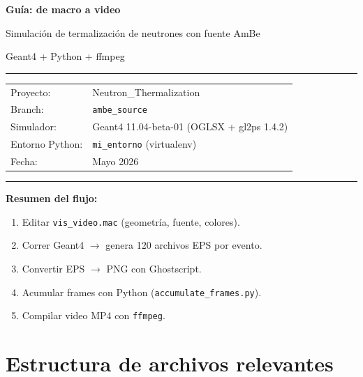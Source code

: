 \documentclass[11pt,a4paper]{article}
\begin{document}
\begin{titlepage}
  \centering
  \vspace*{3cm}
  {\Huge\bfseries Guía: de macro a video\par}
  \vspace{0.5cm}
  {\large Simulación de termalización de neutrones con fuente AmBe\par}
  \vspace{0.3cm}
  {\large Geant4 + Python + ffmpeg\par}
  \vspace{2cm}
  \rule{\textwidth}{1pt}
  \vspace{0.4cm}
  {\normalsize
    \begin{tabular}{ll}
      Proyecto:   & Neutron\_Thermalization \\
      Branch:     & \texttt{ambe\_source} \\
      Simulador:  & Geant4 11.04-beta-01 (OGLSX + gl2ps 1.4.2) \\
      Entorno Python: & \texttt{mi\_entorno} (virtualenv) \\
      Fecha:      & Mayo 2026 \\
    \end{tabular}
  }
  \vspace{0.5cm}
  \rule{\textwidth}{1pt}
  \vspace{2cm}

  \begin{tip}
    \textbf{Resumen del flujo:}
    \begin{enumerate}[noitemsep]
      \item Editar \texttt{vis\_video.mac} (geometría, fuente, colores).
      \item Correr Geant4 $\to$ genera 120 archivos EPS por evento.
      \item Convertir EPS $\to$ PNG con Ghostscript.
      \item Acumular frames con Python (\texttt{accumulate\_frames.py}).
      \item Compilar video MP4 con \texttt{ffmpeg}.
    \end{enumerate}
  \end{tip}
\end{titlepage}

\tableofcontents
\newpage

\section{Estructura de archivos relevantes}
\end{document}
